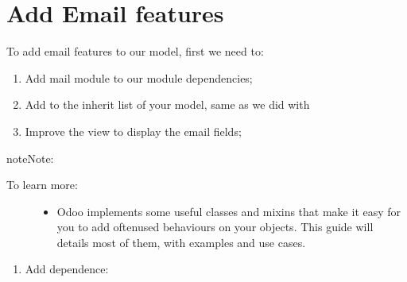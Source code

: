 \documentclass[letterpaper,10pt,english]{sphinxmanual}
\begin{document}
\section{Add Email features}
\label{\detokenize{technical:add-email-features}}
To add email features to our model, first we need to:
\begin{enumerate}
%
\item {} 
Add mail module to our module dependencies;

\item {} 
Add  to the inherit list of your model, same as we did with 

\item {} 
Improve the view to display the email fields;

\end{enumerate}

\begin{sphinxadmonition}{note}{Note:}\begin{description}
\item[{To learn more:}] \leavevmode\begin{itemize}
\item {} 
Odoo implements some useful classes and mixins that make it easy for you to add often\sphinxhyphen{}used behaviours on your objects. This guide will details most of them, with examples and use cases. 

\end{itemize}

\end{description}
\end{sphinxadmonition}
\begin{enumerate}
%
\item {} 
Add dependence:

\end{enumerate}
\end{document}
